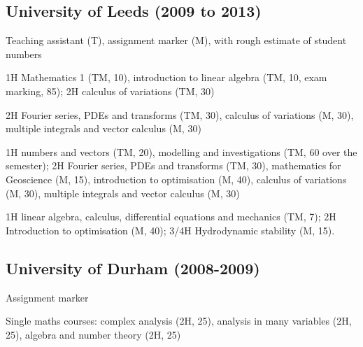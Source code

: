 \documentclass[letterpaper]{article}
\renewenvironment{itemize}{
  \begin{list}{}{
    \setlength{\leftmargin}{1.5em}
  }
}{
  \end{list}
}
\begin{document}
\subsection*{University of Leeds (2009 to 2013)}
\begin{itemize}
\item Teaching assistant (T), assignment marker (M), with rough estimate of
student numbers
\begin{itemize}
	\item[12/13:] 1H Mathematics 1 (TM, 10), introduction to linear algebra (TM,
	10, exam marking, 85); 2H calculus of variations (TM, 30)
	\item[11/12:] 2H Fourier series, PDEs and transforms (TM, 30), calculus of
	variations (M, 30), multiple integrals and vector calculus (M, 30)
	\item[10/11:] 1H numbers and vectors (TM, 20), modelling and investigations
	(TM, 60 over the semester); 2H Fourier series, PDEs and transforms (TM, 30),
	mathematics for Geoscience (M, 15), introduction to optimisation (M, 40),
	calculus of variations (M, 30), multiple integrals and vector calculus (M,
	30)
	\item[09/10:] 1H linear algebra, calculus, differential equations and
	mechanics (TM, 7); 2H Introduction to optimisation (M, 40); 3/4H
	Hydrodynamic stability (M, 15).
\end{itemize}
\end{itemize}


\subsection*{University of Durham (2008-2009)}
\begin{itemize}
\item Assignment marker
\begin{itemize}
	\item[--] Single maths courses: complex analysis (2H, 25), analysis in many
	variables (2H, 25), algebra and number theory (2H, 25)
\end{itemize}
\end{itemize}

\end{document}
